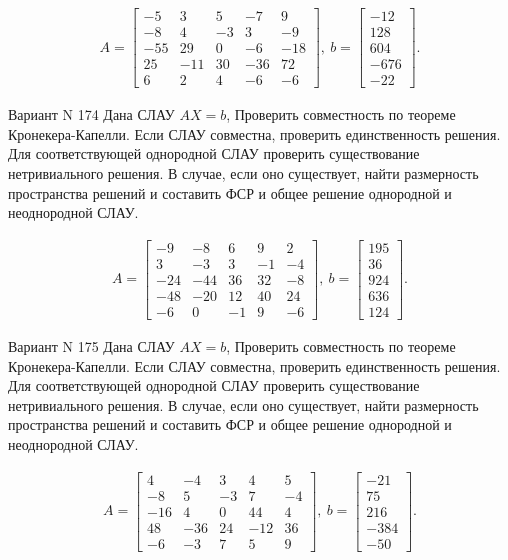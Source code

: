 \documentclass[11pt]{report}
\begin{document}
\begin{align*}
 A = \left[\begin{matrix}-5 & 3 & 5 & -7 & 9\\-8 & 4 & -3 & 3 & -9\\-55 & 29 & 0 & -6 & -18\\25 & -11 & 30 & -36 & 72\\6 & 2 & 4 & -6 & -6\end{matrix}\right],
\ b = \left[\begin{matrix}-12\\128\\604\\-676\\-22\end{matrix}\right]. 
 \end{align*}

Вариант N 174
Дана СЛАУ $AX = b$,
Проверить совместность по теореме Кронекера-Капелли. Если СЛАУ совместна, проверить единственность решения.
Для соответствующей однородной СЛАУ проверить существование нетривиального решения. В случае, если оно существует,
найти размерность пространства решений и составить ФСР и общее решение однородной  и неоднородной СЛАУ.


\begin{align*}
 A = \left[\begin{matrix}-9 & -8 & 6 & 9 & 2\\3 & -3 & 3 & -1 & -4\\-24 & -44 & 36 & 32 & -8\\-48 & -20 & 12 & 40 & 24\\-6 & 0 & -1 & 9 & -6\end{matrix}\right],
\ b = \left[\begin{matrix}195\\36\\924\\636\\124\end{matrix}\right]. 
 \end{align*}

Вариант N 175
Дана СЛАУ $AX = b$,
Проверить совместность по теореме Кронекера-Капелли. Если СЛАУ совместна, проверить единственность решения.
Для соответствующей однородной СЛАУ проверить существование нетривиального решения. В случае, если оно существует,
найти размерность пространства решений и составить ФСР и общее решение однородной  и неоднородной СЛАУ.


\begin{align*}
 A = \left[\begin{matrix}4 & -4 & 3 & 4 & 5\\-8 & 5 & -3 & 7 & -4\\-16 & 4 & 0 & 44 & 4\\48 & -36 & 24 & -12 & 36\\-6 & -3 & 7 & 5 & 9\end{matrix}\right],
\ b = \left[\begin{matrix}-21\\75\\216\\-384\\-50\end{matrix}\right]. 
 \end{align*}
\end{document}
